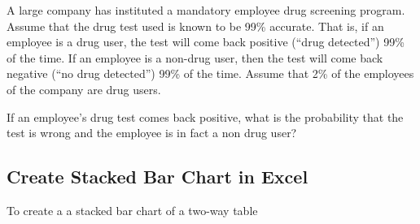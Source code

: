 \begin{exercise}

A large company has instituted a mandatory employee drug screening
program. Assume that the drug test used is known to be 99\% accurate.
That is, if an employee is a drug user, the test will come back positive
(``drug detected'') 99\% of the time. If an employee is a non-drug user,
then the test will come back negative (``no drug detected'') 99\% of the
time. Assume that 2\% of the employees of the company are drug users.

If an employee's drug test comes back positive, what is the probability
that the test is wrong and the employee is in fact a non drug user?

\end{exercise}
\vspace*{6\baselineskip}

\hypertarget{create-stacked-bar-chart-in-excel}{%
\subsection{Create Stacked Bar Chart in
Excel}\label{create-stacked-bar-chart-in-excel}}

To create a a stacked bar chart of a two-way table

